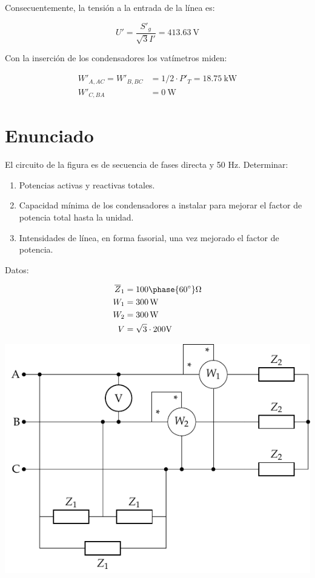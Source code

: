 Consecuentemente, la tensión a la entrada de la línea es:

\[
U' = \frac{S'_g}{\sqrt{3} I'} = \SI{413.63}{\volt}
\]

Con la inserción de los condensadores los vatímetros miden:

\begin{align*}
W'_{A, AC} = W'_{B, BC} &= 1/2 \cdot P'_T = \SI{18.75}{\kilo\watt}\\
W'_{C, BA} &= \SI{0}{\watt}
\end{align*}



\section{Enunciado}

El circuito de la figura es de secuencia de fases directa y 50 Hz. Determinar:
\begin{enumerate}
\item Potencias activas y reactivas totales.
\item Capacidad mínima de los condensadores a instalar para mejorar el factor de potencia total hasta la unidad.
\item Intensidades de línea, en forma fasorial, una vez mejorado el factor de potencia.
\end{enumerate}
\begin{minipage}{0.4\linewidth}
  Datos: 

  \begin{align*}
    \overline{Z}_1 &= {100\phase{\ang{60}}}\unit{\ohm}\\
    W_1 &= \SI{300}{\watt}\\
    W_2 &= \SI{300}{\watt}\\
    V &= {\sqrt{3} \cdot 200}\unit{\volt}
  \end{align*}
\end{minipage}
\begin{minipage}{0.6\linewidth}
  \begin{center}
    \includegraphics{figuras/ZyZt}
  \end{center}
\end{minipage}

